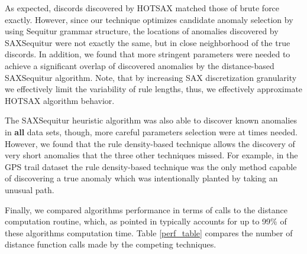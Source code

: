 \documentclass{llncs}
\begin{document}
As expected, discords discovered by HOTSAX matched those of brute force exactly. However, since our technique optimizes candidate anomaly selection by using Sequitur grammar structure, the locations of anomalies discovered by SAXSequitur were not exactly the same, but in close neighborhood of the true discords. In addition, we found that more stringent parameters were needed to achieve a significant overlap of discovered anomalies by the distance-based SAXSequitur algorithm. Note, that by increasing SAX discretization granularity we effectively limit the variability of rule lengths, thus, we effectively approximate HOTSAX algorithm behavior. 

The SAXSequitur heuristic algorithm was also able to discover known anomalies in \textbf{all} data sets, though, more careful parameters selection were at times needed. However, we found that the rule density-based technique allows the discovery of very short anomalies that the three other techniques missed. For example, in the GPS trail dataset the rule density-based technique was the only method capable of discovering a true anomaly which was intentionally planted by taking an unusual path.

Finally, we compared algorithms performance in terms of calls to the distance computation routine, which, as pointed in \cite{hot_sax} typically accounts for up to 99\% of
these algorithms computation time. Table \ref{perf_table} compares the number of distance function calls made by the competing techniques. 
\end{document}
